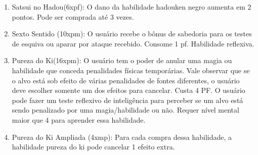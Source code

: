 \begin{enumerate}
	\item Satsui no Hadou(6xpf):	O dano da habilidade hadouken negro aumenta em 2 pontos. Pode ser comprada até 3 vezes.

	\item Sexto Sentido (10xpm): O usuário recebe o bônus de sabedoria para os testes de esquiva ou aparar por ataque recebido. Consome 1 pf. Habilidade reflexiva.



\item Pureza do Ki(16xpm): O usuário tem o poder de anular uma magia ou habilidade que conceda penalidades físicas temporárias. Vale observar que se o alvo está sob efeito de várias penalidades de fontes diferentes, o usuário deve escolher somente um dos efeitos para cancelar. Custa 4 PF. O usuário pode fazer um teste reflexivo de inteligência para perceber se um alvo está sendo penalizado por uma magia/habilidade ou não. Requer nível mental maior que 4 para aprender essa habilidade.

	
\item Pureza do Ki Ampliada (4xmp): Para cada compra dessa habilidade, a habilidade pureza do ki pode cancelar 1 efeito extra.
	

\end{enumerate}

